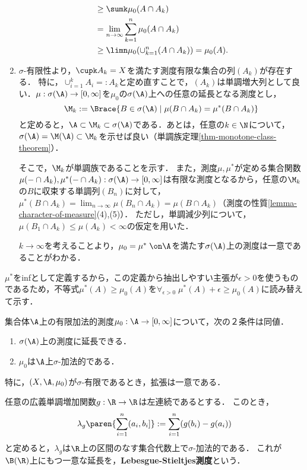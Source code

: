 \documentclass[uplatex, dvipdfmx]{jsreport}
\begin{document}
\begin{Proof}
\begin{enumerate}
\begin{align*}
            &\ge\sumk\mu_0(A\cap A_k)\\
            &=\lim_{n\to\infty}\sum_{k=1}^n\mu_0(A\cap A_k)\\
            &\ge\limn\mu_0(\cup_{k=1}^n(A\cap A_k))=\mu_0(A).
        \end{align*}
        \item 
        $\sigma$-有限性より，$\cupk A_k=X$を満たす測度有限な集合の列$(A_k)$が存在する．
        特に，$\cup_{i=1}^kA_i=:A_k$と定め直すことで，$(A_k)$は単調増大列として良い．$\mu:\sigma(\A)\to[0,\infty]$を$\mu_0$の$\sigma(\A)$上への任意の延長となる測度とし，\[\M_k:=\Brace{B\in\sigma(\A)\mid\mu(B\cap A_k)=\mu^*(B\cap A_k)}\]と定めると，$\A\subset\M_k\subset\sigma(\A)$である．あとは，任意の$k\in\N$について，$\sigma(\A)=\M(\A)\subset\M_k$を示せば良い（単調族定理\ref{thm-monotone-class-theorem}）．

        そこで，$\M_k$が単調族であることを示す．
        また，測度$\mu,\mu^*$が定める集合関数$\mu(-\cap A_k),\mu^*(-\cap A_k):\sigma(\A)\to[0,\infty]$は有限な測度となるから，任意の$\M_k$の$B$に収束する単調列$(B_n)$に対して，$\mu^*(B\cap A_k)=\lim_{n\to\infty}\mu(B_n\cap A_k)=\mu(B\cap A_k)$（測度の性質\ref{lemma-character-of-measure}(4),(5)）．
        ただし，単調減少列について，$\mu(B_1\cap A_k)\le\mu(A_k)<\infty$の仮定を用いた．

        $k\to\infty$を考えることより，$\mu_0=\mu^*\;\on\A$を満たす$\sigma(\A)$上の測度は一意であることがわかる．
    \end{enumerate}
\end{Proof}
\begin{remarks}
    $\mu^*$をinfとして定義するから，この定義から抽出しやすい主張が$\epsilon>0$を使うものであるため，不等式$\mu^*(A)\ge\mu_0(A)$を$\forall_{\epsilon>0}\;\mu^*(A)+\epsilon\ge\mu_0(A)$に読み替えて示す．
\end{remarks}

\begin{theorem}
    集合体$\A$上の有限加法的測度$\mu_0:\A\to[0,\infty]$について，次の２条件は同値．
    \begin{enumerate}
        \item $\sigma(\A)$上の測度に延長できる．
        \item $\mu_0$は$\A$上$\sigma$-加法的である．
    \end{enumerate}
    特に，$(X,\A,\mu_0)$が$\sigma$-有限であるとき，拡張は一意である．
\end{theorem}

\begin{example}
    任意の広義単調増加関数$g:\R\to\R$は左連続であるとする．
    このとき，
    \[\lambda_g\paren{\sum^n_{i=1}(a_i,b_i]}:=\sum^n_{i=1}(g(b_i)-g(a_i))\]
    と定めると，$\lambda_g$は$\R$上の区間のなす集合代数上で$\sigma$-加法的である．
    これが$\B(\R)$上にもつ一意な延長を，\textbf{Lebesgue-Stieltjes測度}という．
\end{example}
\end{document}
